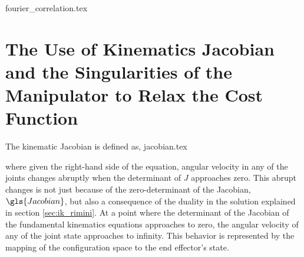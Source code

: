 {fourier_correlation.tex}





\section{The Use of Kinematics Jacobian and the Singularities of the Manipulator to Relax the Cost Function}\label{sec:singularity_4_cost_function}
The kinematic Jacobian is defined as,
{jacobian.tex}

where given the right-hand side of the equation,
angular velocity in any of the joints changes abruptly when the determinant of $J$ 
approaches zero.
This abrupt changes is not just because
of the zero-determinant of the Jacobian, $\gls{Jacobian}$, but also
a consequence of the duality in the solution explained in section \ref{sec:ik_rimini}.
At a point where the determinant of the Jacobian 
of the fundamental kinematics equations approaches to zero, 
the angular velocity of any of the joint state approaches to infinity.
This behavior is represented by the mapping of the configuration space 
to the end effector's state. %

